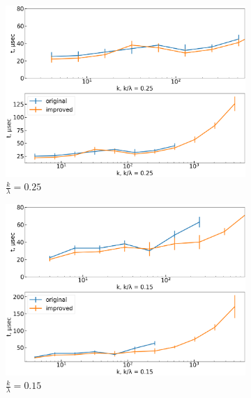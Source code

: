 \documentclass[final,5p,twocolumn,preprint,nopreprintline,times,authoryear]{elsarticle}
\begin{document}
\begin{figure}[t]
	\centering
	\begin{subfigure}[t]{0.46\textwidth}
		\centering
		\includegraphics[width=\linewidth]{boost_scale_fixed_0_25.png}
		\caption{$\frac{k}{\lambda}=0.25$}
	\end{subfigure}
	\quad
	\begin{subfigure}[t]{0.46\textwidth}
		\centering
		\includegraphics[width=\linewidth]{boost_scale_fixed_0_15.png}
		\caption{$\frac{k}{\lambda}=0.15$}
	\end{subfigure} \\
	\begin{subfigure}[t]{0.46\textwidth}
		\centering

\end{subfigure}
\end{figure}
\end{document}
